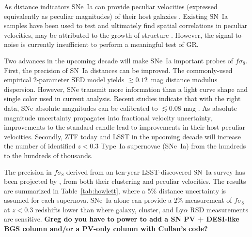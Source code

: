 \documentclass{aastex62}   	%
\begin{document}
As distance indicators SNe~Ia
can provide peculiar velocities (expressed equivalently as peculiar magnitudes)
of their host galaxies \citep{2006PhRvD..73l3526H,2011ApJ...741...67D}.  Existing SN~Ia samples
have been used to test and ultimately find spatial correlations in peculiar velocities, may be attributed to the growth of structure
\citet{2015JCAP...12..033H, 2017JCAP...05..015H}.  However, the signal-to-noise is currently insufficient to perform a meaningful test of GR.

Two advances in the upcoming decade will make SNe~Ia  important probes of $f\sigma_8$.
First, the precision of SN~Ia distances can be improved.  The commonly-used empirical 2-parameter SED model yields $\gtrsim 0.12$~mag distance modulus
dispersion.  However, SNe transmit more information than a light curve shape and single color used in current analysis.
Recent studies indicate that with the right data, SNe absolute
magnitudes can be calibrated to $\lesssim 0.08$ mag \citep[see e.g.][]{2012MNRAS.425.1007B, 2015ApJ...815...58F}.
As absolute magnitude uncertainty propagates into fractional velocity uncertainty, improvements to the standard candle lead to
improvements in their host peculiar velocities.
Secondly,  ZTF today and LSST in the upcoming decade will increase the number of identified  $z<0.3$ Type~Ia supernovae (SNe~Ia)  from the hundreds to the
hundreds of thousands.

The precision in  $f\sigma_8$ derived from an ten-year LSST-discovered  SN~Ia survey has been projected by \citet{2017ApJ...847..128H},
from both their  clustering and peculiar velocities.
The results are summarized in Table~\ref{tab:howlett}, where a 5\% distance uncertainty is assumed for each supernova.
SNe~Ia alone can provide a $2\%$ measurement of $f\sigma_8$ at $z<0.3$ redshifts lower than where galaxy, cluster, and Ly$\alpha$
RSD measurements are sensitive.
{\bf Greg do you have to power to add a SN PV + DESI-like BGS column and/or a PV-only column with Cullan's code? }
\end{document}
